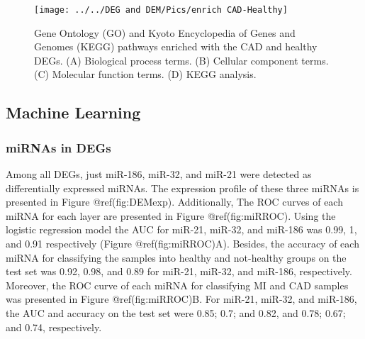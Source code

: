 \documentclass[smallextended]{svjour3}       %
\begin{document}
\begin{figure}
\texttt{[image: ../../DEG and DEM/Pics/enrich CAD-Healthy]} \caption{Gene Ontology (GO) and Kyoto Encyclopedia of Genes and Genomes (KEGG) pathways enriched with the CAD and healthy DEGs. (A) Biological process terms. (B) Cellular component terms. (C) Molecular function terms. (D) KEGG analysis.}\label{fig:CADHEnrich}
\end{figure}

\hypertarget{machine-learning}{%
\subsection{Machine Learning}\label{machine-learning}}

\hypertarget{mirnas-in-degs-1}{%
\subsubsection{miRNAs in DEGs}\label{mirnas-in-degs-1}}

Among all DEGs, just miR-186, miR-32, and miR-21 were detected as
differentially expressed miRNAs. The expression profile of these three
miRNAs is presented in Figure @ref(fig:DEMexp). Additionally, The ROC
curves of each miRNA for each layer are presented in Figure
@ref(fig:miRROC). Using the logistic regression model the AUC for
miR-21, miR-32, and miR-186 was 0.99, 1, and 0.91 respectively (Figure
@ref(fig:miRROC)A). Besides, the accuracy of each miRNA for classifying
the samples into healthy and not-healthy groups on the test set was
0.92, 0.98, and 0.89 for miR-21, miR-32, and miR-186, respectively.
Moreover, the ROC curve of each miRNA for classifying MI and CAD samples
was presented in Figure @ref(fig:miRROC)B. For miR-21, miR-32, and
miR-186, the AUC and accuracy on the test set were 0.85; 0.7; and 0.82,
and 0.78; 0.67; and 0.74, respectively.
\end{document}
